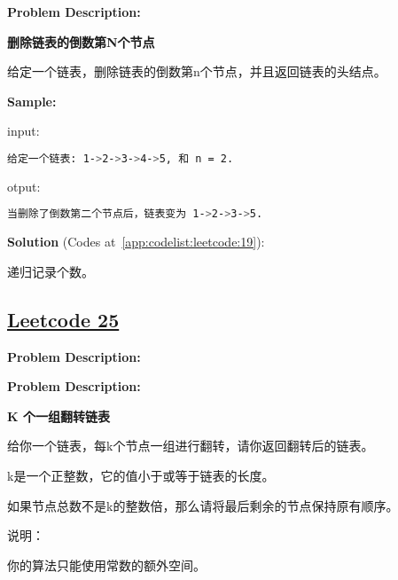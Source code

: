 \textbf{Problem Description:}\par

\textbf{删除链表的倒数第N个节点}\par

给定一个链表，删除链表的倒数第n个节点，并且返回链表的头结点。\par


\textbf{Sample:}\par

input:\par

\begin{lstlisting}[language=bash]
给定一个链表: 1->2->3->4->5, 和 n = 2.
\end{lstlisting}

otput:\par

\begin{lstlisting}[language=bash]
当删除了倒数第二个节点后，链表变为 1->2->3->5.
\end{lstlisting}

\textbf{Solution }(Codes at~\ref{app:codelist:leetcode:19}):\par

递归记录个数。\par



\subsection{\href{https://leetcode-cn.com/}{Leetcode 25}}\label{app:problemlist:leetcode:25}

\textbf{Problem Description:}\par

\textbf{Problem Description:}\par

\textbf{K 个一组翻转链表}\par

给你一个链表，每k个节点一组进行翻转，请你返回翻转后的链表。\par

k是一个正整数，它的值小于或等于链表的长度。\par

如果节点总数不是k的整数倍，那么请将最后剩余的节点保持原有顺序。\par

说明：\par

你的算法只能使用常数的额外空间。\par

